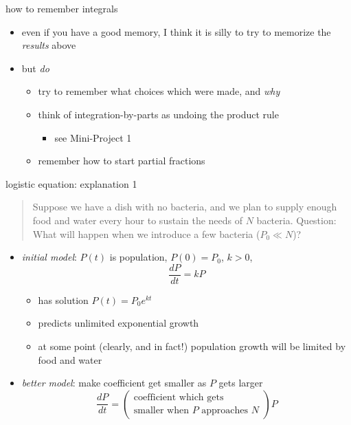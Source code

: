 \documentclass{beamer}
\begin{document}
\begin{frame}{how to remember integrals}

\begin{itemize}
\item even if you have a good memory, I think it is silly to try to memorize the \emph{results} above
\item but \emph{do}
    \begin{itemize}
    \item try to remember what choices which were made, and \emph{why}
    \item think of integration-by-parts as undoing the product rule
        \begin{itemize}
        \item see Mini-Project 1
        \end{itemize}
    \item remember how to start partial fractions
    \end{itemize}
\end{itemize}
\end{frame}


\begin{frame}{logistic equation: explanation 1}

\small
\begin{quotation}
\noindent Suppose we have a dish with no bacteria, and we plan to supply enough food and water every hour to sustain the needs of $N$ bacteria.  Question: What will happen when we introduce a few bacteria ($P_0 \ll N$)?
\end{quotation}

\normalsize
\begin{itemize}
\item \emph{initial model}:  $P(t)$ is population, $P(0)=P_0$, $k>0$,
    $$\frac{dP}{dt} = k P$$

\vspace{-2mm}
    \begin{itemize}
    \item has solution $P(t) = P_0 e^{kt}$
    \item predicts unlimited exponential growth
    \item at some point (clearly, and in fact!) population growth will be limited by food and water
    \end{itemize}
\item \emph{better model}: make coefficient get smaller as $P$ gets larger
    $$\frac{dP}{dt} = \left(\begin{matrix} \text{coefficient which gets} \\ \text{smaller when $P$ approaches $N$}\end{matrix} \right) P$$
\end{itemize}
\end{frame}
\end{document}

